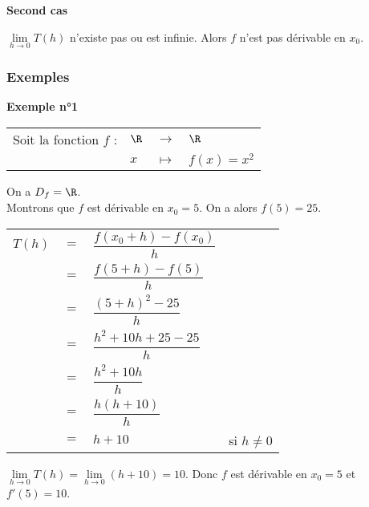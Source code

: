 \textbf{Second cas}

$\lim\limits_{h \to 0} T(h)$ n'existe pas ou est infinie. Alors $f$ n'est pas dérivable en $x_0$. \\

\newpage

\vspace*{-1.8cm}

\subsubsection{Exemples}

\textbf{Exemple n°1} \\

\begin{tabular}{llll}
Soit la fonction $f$ : & $\R$ & $\longrightarrow$ & $\R$ \\
& $x$ & $\longmapsto$ & $f\left(x\right) = x^2$ \\
\end{tabular}

On a $D_f = \R$. \\

Montrons que $f$ est dérivable en $x_0 = 5$. On a alors $f(5) = 25$. \\

\begin{tabular}{llll}
$T(h)$ & $=$ & $\dfrac{f(x_0 + h) - f(x_0)}{h}$ & \vspace*{.3cm} \\
& $=$ & $\dfrac{f(5 + h) - f(5)}{h}$ & \vspace*{.3cm} \\
& $=$ & $\dfrac{(5+h)^2 - 25}{h}$ & \vspace*{.3cm} \\
& $=$ & $\dfrac{h^2 + 10h + 25 - 25}{h}$ & \vspace*{.3cm} \\
& $=$ & $\dfrac{h^2 + 10h}{h}$ & \vspace*{.3cm} \\
& $=$ & $\dfrac{h\left(h+ 10\right)}{h}$ & \vspace*{.3cm} \\
& $=$ & $ h + 10$ & si $h \neq 0$ \vspace*{.3cm} \\
\end{tabular}

$\lim\limits_{h \to 0} T(h) = \lim\limits_{h \to 0} (h + 10) = 10$. Donc $f$ est dérivable en $x_0 = 5$ et $f'(5) = 10$. \\

